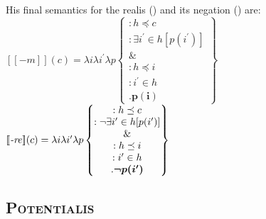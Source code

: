 \documentclass[10pt]{article}
\newcommand{\denote}[1]{\mbox{$[\![\mbox{#1}]\!]$}}
\begin{document}
His final semantics for the realis (\nextx) and its negation (\anextx) are:
\pex $\denote{$-m$}(c)=\lambda i\lambda i^\prime\lambda p\begin{Bmatrix}:h\preceq c\\
	:\exists i^\prime\in h[p(i^\prime)]\\
	\&\\
	:h\preceq i\\
	:i^\prime\in h\\
	.\boldsymbol{p(i)}
		\end{Bmatrix}$	\xe
\pex $\denote{\textit{-re}}(c)=\lambda i\lambda i^\prime\lambda p\begin{Bmatrix}:h\preceq c\\
:\neg\exists i^\prime\in h[p(i^\prime)]\\
\&\\
:h\preceq i\\
:i^\prime\in h\\
.\boldsymbol{\neg p(i^\prime)}
\end{Bmatrix}$
	

\subsection{\textsc{Potentialis}}
\end{document}
